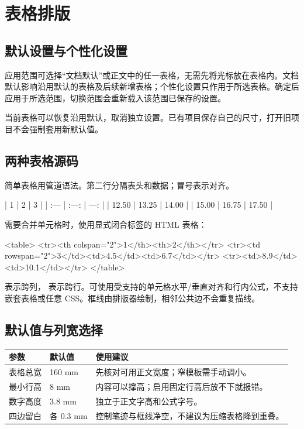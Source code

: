 \chapter{表格排版}\label{ch:tables}
\section{默认设置与个性化设置}
应用范围可选择“文档默认”或正文中的任一表格，无需先将光标放在表格内。文档默认影响沿用默认的表格及后续新增表格；个性化设置只作用于所选表格。确定后应用于所选范围，切换范围会重新载入该范围已保存的设置。

当前表格可以恢复沿用默认，取消独立设置。已有项目保存自己的尺寸，打开旧项目不会强制套用新默认值。

\section{两种表格源码}
简单表格用管道语法。第二行分隔表头和数据；冒号表示对齐。
\par\noindent\begin{minipage}{\linewidth}
\begin{Source}
| 1 | 2 | 3 |
| :--- | :---: | ---: |
| 12.50 | 13.25 | 14.00 |
| 15.00 | 16.75 | 17.50 |
\end{Source}
\end{minipage}\par\medskip
需要合并单元格时，使用显式闭合标签的 HTML 表格：
\par\noindent\begin{minipage}{\linewidth}
\begin{Source}
<table>
  <tr><th colspan="2">1</th><th>2</th></tr>
  <tr><td rowspan="2">3</td><td>4.5</td><td>6.7</td></tr>
  <tr><td>8.9</td><td>10.1</td></tr>
</table>
\end{Source}
\end{minipage}\par\medskip
{} 表示跨列， 表示跨行。可使用受支持的单元格水平/垂直对齐和行内公式，不支持嵌套表格或任意 CSS。框线由排版器绘制，相邻公共边不会重复描线。

\section{默认值与列宽选择}
\par\noindent\begin{tabularx}{\linewidth}{@{}P{37mm}P{25mm}Y@{}}
\toprule
参数 & 默认值 & 使用建议\\\midrule
表格总宽 & 160 mm & 先核对可用正文宽度；窄模板需手动调小。\\
最小行高 & 8 mm & 内容可以撑高；启用固定行高后放不下就报错。\\
数字高度 & 3.8 mm & 独立于正文字高和公式字号。\\
四边留白 & 各 0.3 mm & 控制笔迹与框线净空，不建议为压缩表格降到重叠。\\
\bottomrule
\end{tabularx}

